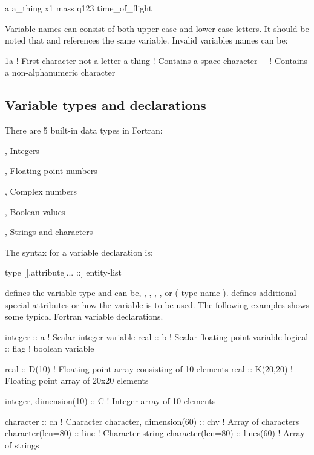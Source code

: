 \begin{fortrancodeenv}
a
a_thing
x1
mass
q123
time_of_flight
\end{fortrancodeenv}

Variable names can consist of both upper case and lower case letters. It should be noted that  and  references the same variable. Invalid variables names can be:

\begin{fortrancodeenv}
1a      ! First character not a letter
a thing ! Contains a space character
_       ! Contains a non-alphanumeric character
\end{fortrancodeenv}

\subsection{Variable types and declarations}

There are 5 built-in data types in Fortran:

\begin{xlist}
    \item {}, Integers
    \item {}, Floating point numbers
    \item {}, Complex numbers
    \item {}, Boolean values
    \item {}, Strings and characters
\end{xlist}

The syntax for a variable declaration is:

\begin{fsyntax}
type [[,attribute]... ::] entity-list
\end{fsyntax}

 defines the variable type and can be, , , , , or ( type-name ).  defines additional special attributes or how the variable is to be used. The following examples shows
some typical Fortran variable declarations.

\begin{fortrancodeenv}
integer :: a     ! Scalar integer variable
real :: b        ! Scalar floating point variable
logical :: flag  ! boolean variable

real :: D(10)    ! Floating point array consisting of 10 elements
real :: K(20,20) ! Floating point array of 20x20 elements

integer, dimension(10) :: C     ! Integer array of 10 elements

character :: ch                 ! Character
character, dimension(60) :: chv ! Array of characters
character(len=80) :: line       ! Character string
character(len=80) :: lines(60)  ! Array of strings
\end{fortrancodeenv}

